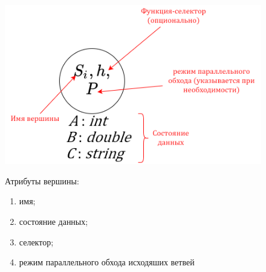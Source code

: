 \begin{frame}
	\begin{figure}
		\begin{minipage}{0.49\textwidth}
			\centering
			\includegraphics[width=\textwidth]{images/illustration.node.png}
		\end{minipage}\hfill\begin{minipage}{0.49\textwidth}
			Атрибуты вершины:
			\begin{enumerate}
				\item имя;
				\item состояние данных;
				\item селектор;
				\item режим параллельного обхода исходяших ветвей
			\end{enumerate}
		\end{minipage}\hfill
	\end{figure}
\end{frame}
